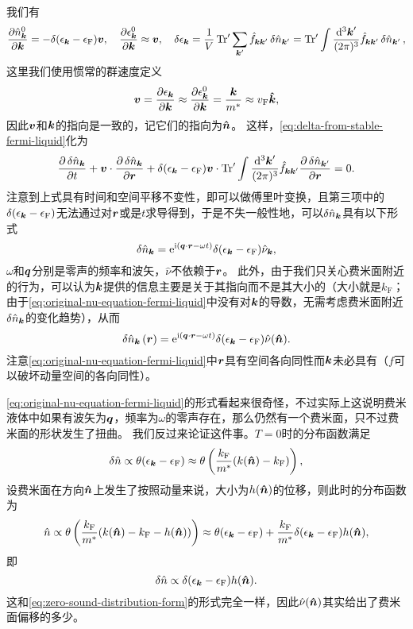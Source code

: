 我们有
\[
    \pdv{\hat{n}^0_{\vb*{k}}}{\vb*{k}} = - \delta(\epsilon_{\vb*{k}} - \epsilon_\text{F}) \vb*{v}, \quad  \pdv{\epsilon_{\vb*{k}}^0}{\vb*{k}} \approx \vb*{v}, \quad \var{\epsilon_{\vb*{k}}} = \frac{1}{V} \Trace' \sum_{\vb*{k}'} \hat{f}_{\vb*{k} \vb*{k}'} \var{\hat{n}_{\vb*{k}'}} = \Trace' \int \frac{\dd[3]{\vb*{k}'}}{(2\pi)^3} \hat{f}_{\vb*{k} \vb*{k}'} \var{\hat{n}_{\vb*{k}'}},
\]
这里我们使用惯常的群速度定义
\begin{equation}
    \vb*{v} = \pdv{\epsilon_{\vb*{k}}}{\vb*{k}} \approx \pdv{\epsilon^0_{\vb*{k}}}{\vb*{k}} = \frac{\vb*{k}}{m^*} \approx v_\text{F} \vu*{k},
\end{equation}
因此$\vb*{v}$和$\vb*{k}$的指向是一致的，记它们的指向为$\vu*{n}$。
这样，\eqref{eq:delta-from-stable-fermi-liquid}化为
\begin{equation}
    \pdv{\var{\hat{n}_{\vb*{k}}}}{t} + \vb*{v} \cdot \pdv{\var{\hat{n}_{\vb*{k}}}}{\vb*{r}} + \delta(\epsilon_{\vb*{k}} - \epsilon_\text{F}) \vb*{v} \cdot \Trace' \int \frac{\dd[3]{\vb*{k}'}}{(2\pi)^3} \hat{f}_{\vb*{k} \vb*{k}'} \pdv{\var{\hat{n}_{\vb*{k}'}}}{\vb*{r}} = 0.
    \label{eq:original-nu-equation-fermi-liquid}
\end{equation}
注意到上式具有时间和空间平移不变性，即可以做傅里叶变换，且第三项中的$\delta(\epsilon_{\vb*{k}} - \epsilon_\text{F})$无法通过对$\vb*{r}$或是$t$求导得到，于是不失一般性地，可以$\var{\hat{n}_{\vb*{k}}}$具有以下形式
\[
    \var{\hat{n}_{\vb*{k}}} = \mathrm{e}^{\mathrm{i} (\vb*{q} \cdot \vb*{r} - \omega t)} \delta(\epsilon_{\vb*{k}} - \epsilon_\text{F}) \hat{\nu}_{\vb*{k}},
\]
$\omega$和$\vb*{q}$分别是零声的频率和波矢，$\hat{\nu}$不依赖于$\vb*{r}$。
此外，由于我们只关心费米面附近的行为，可以认为$\vb*{k}$提供的信息主要是关于其指向而不是其大小的（大小就是$k_\text{F}$；由于\eqref{eq:original-nu-equation-fermi-liquid}中没有对$\vb*{k}$的导数，无需考虑费米面附近$\var{\hat{n}_{\vb*{k}}}$的变化趋势），从而
\begin{equation}
    \var{\hat{n}_{\vb*{k}}}(\vb*{r}) = \mathrm{e}^{\mathrm{i} (\vb*{q} \cdot \vb*{r} - \omega t)} \delta(\epsilon_{\vb*{k}} - \epsilon_\text{F}) \hat{\nu}(\vu*{n}).
    \label{eq:zero-sound-distribution-form}
\end{equation}
注意\eqref{eq:original-nu-equation-fermi-liquid}中$\vb*{r}$具有空间各向同性而$\vb*{k}$未必具有（$f$可以破坏动量空间的各向同性）。

\eqref{eq:original-nu-equation-fermi-liquid}的形式看起来很奇怪，不过实际上这说明费米液体中如果有波矢为$\vb*{q}$，频率为$\omega$的零声存在，那么仍然有一个费米面，只不过费米面的形状发生了扭曲。
我们反过来论证这件事。$T=0$时的分布函数满足
\[
    \var{\hat{n}} \propto \theta(\epsilon_{\vb*{k}} - \epsilon_\text{F}) \approx \theta\left( \frac{k_\text{F}}{m^*} (k(\vu*{n}) - k_\text{F}) \right),
\]
设费米面在方向$\vu*{n}$上发生了按照动量来说，大小为$h(\vu*{n})$的位移，则此时的分布函数为
\[
    \hat{n} \propto \theta\left( \frac{k_\text{F}}{m^*} (k(\vu*{n}) - k_\text{F} - h(\vu*{n})) \right) \approx \theta(\epsilon_{\vb*{k}} - \epsilon_\text{F}) + \frac{k_\text{F}}{m^*} \delta(\epsilon_{\vb*{k}} - \epsilon_\text{F}) h(\vu*{n}),
\]
即
\[
    \var{\hat{n}} \propto \delta(\epsilon_{\vb*{k}} - \epsilon_\text{F}) h(\vu*{n}).
\]
这和\eqref{eq:zero-sound-distribution-form}的形式完全一样，因此$\hat{\nu}(\vu*{n})$其实给出了费米面偏移的多少。

